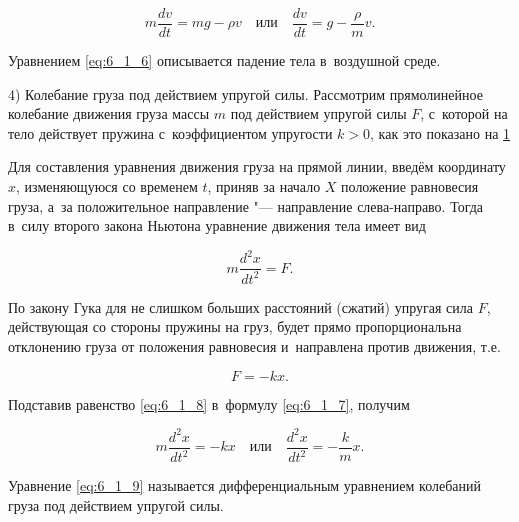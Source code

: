 \begin{equation}\label{eq:6_1_6}
m\dfrac{dv}{dt} = mg - \rho v \quad \text{или} \quad \dfrac{dv}{dt} = g - \dfrac{\rho}{m} v.
\end{equation}

Уравнением \eqref{eq:6_1_6} описывается падение тела в~воздушной среде.

4) Колебание груза под действием упругой силы. Рассмотрим прямолинейное колебание
движения груза массы $m$ под действием упругой силы $F$, с~которой на тело
действует пружина с~коэффициентом упругости $k > 0$, как это показано на \ref{fig:6_1_1}

\begin{figure}\label{fig:6_1_1}
\end{figure}

Для составления уравнения движения груза на прямой линии, введём координату $x$,
изменяющуюся со временем $t$, приняв за начало $X$ положение равновесия груза,
а~за положительное направление "--- направление слева-направо.
Тогда в~силу второго закона Ньютона уравнение движения тела имеет вид

\begin{equation}\label{eq:6_1_7}
m \dfrac{d^{2}x}{dt^{2}} = F.
\end{equation}

По закону Гука для не слишком больших расстояний (сжатий) упругая сила $F$,
действующая со стороны пружины на груз, будет прямо пропорциональна
отклонению груза от положения равновесия и~направлена против движения, т.е.\

\begin{equation}\label{eq:6_1_8}
F = -kx.
\end{equation}

\noindent
Подставив равенство \eqref{eq:6_1_8} в~формулу \eqref{eq:6_1_7}, получим

\begin{equation}\label{eq:6_1_9}
m \dfrac{d^{2}x}{dt^{2}} = -kx
\quad \text{или} \quad
\dfrac{d^{2}x}{dt^{2}} = - \dfrac{k}{m} x.
\end{equation}

Уравнение \eqref{eq:6_1_9} называется дифференциальным уравнением колебаний груза
под действием упругой силы.
